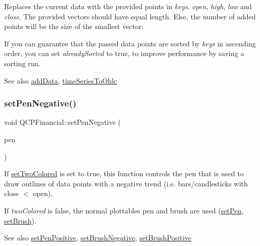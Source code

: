Replaces the current data with the provided points in {\itshape keys}, {\itshape open}, {\itshape high}, {\itshape low} and {\itshape close}. The provided vectors should have equal length. Else, the number of added points will be the size of the smallest vector.

If you can guarantee that the passed data points are sorted by {\itshape keys} in ascending order, you can set {\itshape already\+Sorted} to true, to improve performance by saving a sorting run.

\begin{DoxySeeAlso}{See also}
\hyperlink{class_q_c_p_financial_a372ac031e44a7a6c912d203556af96f7}{add\+Data}, \hyperlink{class_q_c_p_financial_a9a058c035040d3939b8884f4aaccb1a7}{time\+Series\+To\+Ohlc} 
\end{DoxySeeAlso}
\mbox{\label{class_q_c_p_financial_afe5c07e94ccea01a75b3a2476993c346}} 
\subsubsection{\texorpdfstring{set\+Pen\+Negative()}{setPenNegative()}}
{\footnotesize\ttfamily void Q\+C\+P\+Financial\+::set\+Pen\+Negative (\begin{DoxyParamCaption}\item[{const Q\+Pen \&}]{pen }\end{DoxyParamCaption})}

If \hyperlink{class_q_c_p_financial_a138e44aac160a17a9676652e240c5f08}{set\+Two\+Colored} is set to true, this function controls the pen that is used to draw outlines of data points with a negative trend (i.\+e. bars/candlesticks with close $<$ open).

If {\itshape two\+Colored} is false, the normal plottable\textquotesingle{}s pen and brush are used (\hyperlink{class_q_c_p_abstract_plottable_ab74b09ae4c0e7e13142fe4b5bf46cac7}{set\+Pen}, \hyperlink{class_q_c_p_abstract_plottable_a7a4b92144dca6453a1f0f210e27edc74}{set\+Brush}).

\begin{DoxySeeAlso}{See also}
\hyperlink{class_q_c_p_financial_ac58aa3adc7a35aab0088764b840683e5}{set\+Pen\+Positive}, \hyperlink{class_q_c_p_financial_a8bbdd87629f9144b3ef51af660c0961a}{set\+Brush\+Negative}, \hyperlink{class_q_c_p_financial_a5ebff2b1764efd07cc44942e67821829}{set\+Brush\+Positive} 
\end{DoxySeeAlso}
\mbox{\label{class_q_c_p_financial_ac58aa3adc7a35aab0088764b840683e5}} 
